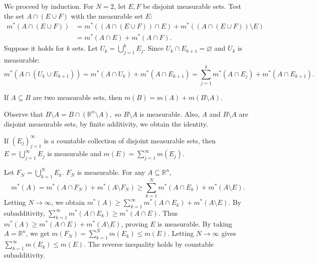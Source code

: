 \begin{pfbox}
    We proceed by induction. For $N=2$, let $E, F$ be disjoint measurable sets. Test the set $A \cap (E \cup F)$ with the measurable set $E$:
    \begin{align*}
        m^*(A \cap (E \cup F)) &= m^*((A \cap (E \cup F)) \cap E) + m^*((A \cap (E \cup F)) \setminus E) \\
        &= m^*(A \cap E) + m^*(A \cap F).
    \end{align*}
    Suppose it holds for $k$ sets. Let $U_k = \bigcup_{j=1}^k E_j$. Since $U_k \cap E_{k+1} = \varnothing$ and $U_k$ is measurable:
    \[ m^*(A \cap (U_k \cup E_{k+1})) = m^*(A \cap U_k) + m^*(A \cap E_{k+1}) = \sum_{j=1}^k m^*(A \cap E_j) + m^*(A \cap E_{k+1}). \]
\end{pfbox}

\begin{corollary}
    If $A \subseteq B$ are two measurable sets, then $m(B) = m(A) + m(B \setminus A)$.
\end{corollary}

\begin{pfbox}
    Observe that $B\setminus A = B\cap(\mathbb{R}^n\setminus A),$ so $B\setminus A$ is measurable.
    Also, $A$ and $B\setminus A$ are disjoint measurable sets, by finite additivity, we obtain the identity.
\end{pfbox}

\begin{theorem}
    If $(E_j)_{j=1}^\infty$ is a countable collection of disjoint measurable sets, then $E = \bigcup_{j=1}^\infty E_j$ is measurable and $m(E) = \sum_{j=1}^\infty m(E_j)$.
\end{theorem}

\begin{pfbox}
    Let $F_N = \bigcup_{k=1}^N E_k$. $F_N$ is measurable. For any $A \subseteq \mathbb{R}^n$,
    \[ m^*(A) = m^*(A \cap F_N) + m^*(A \setminus F_N) \ge \sum_{k=1}^N m^*(A \cap E_k) + m^*(A \setminus E). \]
    Letting $N \to \infty$, we obtain $m^*(A) \ge \sum_{k=1}^\infty m^*(A \cap E_k) + m^*(A \setminus E)$.
    By subadditivity, $\sum_{k=1}^\infty m^*(A \cap E_k) \ge m^*(A \cap E)$. 
    Thus $m^*(A) \ge m^*(A \cap E) + m^*(A \setminus E)$, proving $E$ is measurable.
    By taking $A = \mathbb{R}^n$, we get $m(F_N) = \sum_{k=1}^N m(E_k) \le m(E)$. Letting $N \to \infty$ gives $\sum_{k=1}^\infty m(E_k) \le m(E)$. The reverse inequality holds by countable subadditivity.
\end{pfbox}


